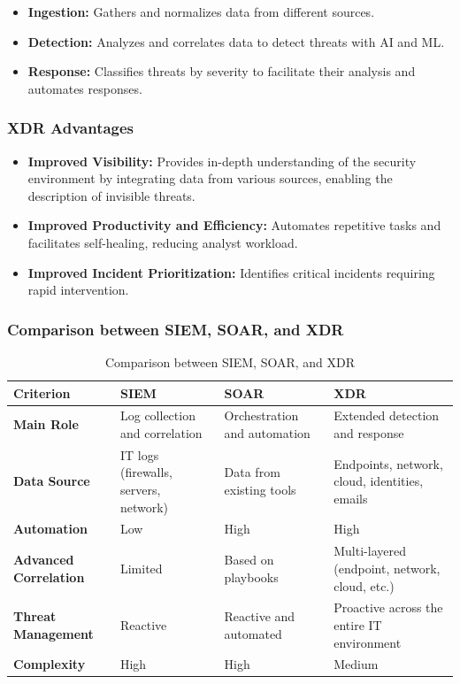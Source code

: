 \begin{itemize}
    \item \textbf{Ingestion:} Gathers and normalizes data from different sources.
    \item \textbf{Detection:} Analyzes and correlates data to detect threats with AI and ML.
    \item \textbf{Response:} Classifies threats by severity to facilitate their analysis and automates responses.
\end{itemize}

\subsubsection{XDR Advantages}

\begin{itemize}
    \item \textbf{Improved Visibility:} Provides in-depth understanding of the security environment by integrating data from various sources, enabling the description of invisible threats.
    \item \textbf{Improved Productivity and Efficiency:} Automates repetitive tasks and facilitates self-healing, reducing analyst workload.
    \item \textbf{Improved Incident Prioritization:} Identifies critical incidents requiring rapid intervention.
\end{itemize}

\subsubsection{Comparison between SIEM, SOAR, and XDR}

\begin{table}[H]
\centering
\caption{Comparison between SIEM, SOAR, and XDR}
\label{tab:siem-soar-xdr}
\footnotesize
\setlength{\tabcolsep}{3pt}
\renewcommand{\arraystretch}{1.3}
\begin{tabular}{>{\RaggedRight\arraybackslash}p{2.5cm} p{3.5cm} p{3.5cm} p{3.5cm}}
\toprule
\rowcolor{tableheader}
\textbf{Criterion} & \textbf{SIEM} & \textbf{SOAR} & \textbf{XDR} \\
\midrule
\textbf{Main Role} & Log collection and correlation & Orchestration and automation & Extended detection and response \\
\midrule
\textbf{Data Source} & IT logs (firewalls, servers, network) & Data from existing tools & Endpoints, network, cloud, identities, emails \\
\midrule
\textbf{Automation} & Low & High & High \\
\midrule
\textbf{Advanced Correlation} & Limited & Based on playbooks & Multi-layered (endpoint, network, cloud, etc.) \\
\midrule
\textbf{Threat Management} & Reactive & Reactive and automated & Proactive across the entire IT environment \\
\midrule
\textbf{Complexity} & High & High & Medium \\
\bottomrule
\end{tabular}
\end{table}

